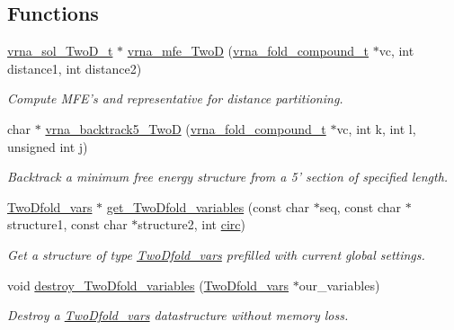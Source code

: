 \subsection*{Functions}
\begin{DoxyCompactItemize}
\item 
\hyperlink{group__kl__neighborhood__mfe_structvrna__sol__TwoD__t}{vrna\-\_\-sol\-\_\-\-Two\-D\-\_\-t} $\ast$ \hyperlink{group__kl__neighborhood__mfe_ga243c288b463147352829df04de6a2f77}{vrna\-\_\-mfe\-\_\-\-Two\-D} (\hyperlink{group__fold__compound_ga1b0cef17fd40466cef5968eaeeff6166}{vrna\-\_\-fold\-\_\-compound\-\_\-t} $\ast$vc, int distance1, int distance2)
\begin{DoxyCompactList}\small\item\em Compute M\-F\-E's and representative for distance partitioning. \end{DoxyCompactList}\item 
char $\ast$ \hyperlink{group__kl__neighborhood__mfe_ga15a96fc96f4f4c2e01a11b3e17d1ef43}{vrna\-\_\-backtrack5\-\_\-\-Two\-D} (\hyperlink{group__fold__compound_ga1b0cef17fd40466cef5968eaeeff6166}{vrna\-\_\-fold\-\_\-compound\-\_\-t} $\ast$vc, int k, int l, unsigned int j)
\begin{DoxyCompactList}\small\item\em Backtrack a minimum free energy structure from a 5' section of specified length. \end{DoxyCompactList}\item 
\hyperlink{group__kl__neighborhood__mfe_structTwoDfold__vars}{Two\-Dfold\-\_\-vars} $\ast$ \hyperlink{group__kl__neighborhood__mfe_gac9284f132cf0eaa0a2f43590eda05488}{get\-\_\-\-Two\-Dfold\-\_\-variables} (const char $\ast$seq, const char $\ast$structure1, const char $\ast$structure2, int \hyperlink{group__model__details_gaf9202a1a09f5828dc731e2d9a10fa111}{circ})
\begin{DoxyCompactList}\small\item\em Get a structure of type \hyperlink{group__kl__neighborhood__mfe_structTwoDfold__vars}{Two\-Dfold\-\_\-vars} prefilled with current global settings. \end{DoxyCompactList}\item 
void \hyperlink{group__kl__neighborhood__mfe_ga05bf4f31d216b1b160fd2d3d68e9b487}{destroy\-\_\-\-Two\-Dfold\-\_\-variables} (\hyperlink{group__kl__neighborhood__mfe_structTwoDfold__vars}{Two\-Dfold\-\_\-vars} $\ast$our\-\_\-variables)
\begin{DoxyCompactList}\small\item\em Destroy a \hyperlink{group__kl__neighborhood__mfe_structTwoDfold__vars}{Two\-Dfold\-\_\-vars} datastructure without memory loss. \end{DoxyCompactList}\item 

\end{DoxyCompactItemize}
